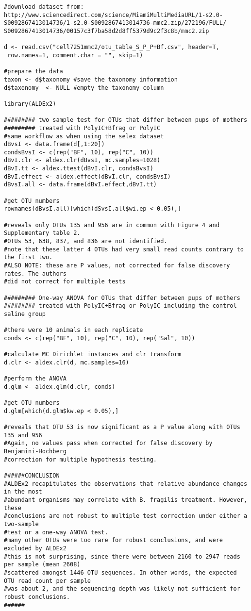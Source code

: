 \documentclass[11pt]{article}
\begin{document}
\begin{verbatim}
#download dataset from: 
http://www.sciencedirect.com/science/MiamiMultiMediaURL/1-s2.0-
S0092867413014736/1-s2.0-S0092867413014736-mmc2.zip/272196/FULL/
S0092867413014736/00157c3f7ba58d2d8ff5379d9c2f3c8b/mmc2.zip

d <- read.csv("cell7251mmc2/otu_table_S_P_P+Bf.csv", header=T, 
 row.names=1, comment.char = "", skip=1)

#prepare the data
taxon <- d$taxonomy #save the taxonomy information
d$taxonomy  <- NULL #empty the taxonomy column

library(ALDEx2)

######### two sample test for OTUs that differ between pups of mothers 
######### treated with PolyIC+Bfrag or PolyIC
#same workflow as when using the selex dataset
dBvsI <- data.frame(d[,1:20])
condsBvsI <- c(rep("BF", 10), rep("C", 10))
dBvI.clr <- aldex.clr(dBvsI, mc.samples=1028)
dBvI.tt <- aldex.ttest(dBvI.clr, condsBvsI)
dBvI.effect <- aldex.effect(dBvI.clr, condsBvsI)
dBvsI.all <- data.frame(dBvI.effect,dBvI.tt)

#get OTU numbers
rownames(dBvsI.all)[which(dSvsI.all$wi.ep < 0.05),]

#reveals only OTUs 135 and 956 are in common with Figure 4 and Supplementary table 2.
#OTUs 53, 638, 837, and 836 are not identified.
#note that these latter 4 OTUs had very small read counts contrary to the first two.
#ALSO NOTE: these are P values, not corrected for false discovery rates. The authors
#did not correct for multiple tests 

######### One-way ANOVA for OTUs that differ between pups of mothers 
######### treated with PolyIC+Bfrag or PolyIC including the control saline group

#there were 10 animals in each replicate
conds <- c(rep("BF", 10), rep("C", 10), rep("Sal", 10))

#calculate MC Dirichlet instances and clr transform
d.clr <- aldex.clr(d, mc.samples=16) 

#perform the ANOVA
d.glm <- aldex.glm(d.clr, conds)

#get OTU numbers
d.glm[which(d.glm$kw.ep < 0.05),]

#reveals that OTU 53 is now significant as a P value along with OTUs 135 and 956
#Again, no values pass when corrected for false discovery by Benjamini-Hochberg
#correction for multiple hypothesis testing. 

######CONCLUSION
#ALDEx2 recapitulates the observations that relative abundance changes in the most 
#abundant organisms may correlate with B. fragilis treatment. However, these
#conclusions are not robust to multiple test correction under either a two-sample
#test or a one-way ANOVA test.
#many other OTUs were too rare for robust conclusions, and were excluded by ALDEx2
#this is not surprising, since there were between 2160 to 2947 reads per sample (mean 2608)
#scattered amongst 1446 OTU sequences. In other words, the expected OTU read count per sample
#was about 2, and the sequencing depth was likely not sufficient for robust conclusions.
######

\end{verbatim}
\newpage
\end{document}
